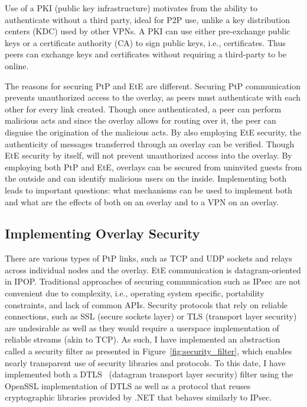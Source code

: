 Use of a PKI (public key infrastructure) motivates from the ability to
authenticate without a third party, ideal for P2P use, unlike a key
distribution centers (KDC) used by other VPNs.  A PKI can use either
pre-exchange public keys or a certificate authority (CA) to sign public keys,
i.e., certificates.  Thus peers can exchange keys and certificates without
requiring a third-party to be online.

The reasons for securing PtP and EtE are different.  Securing PtP communication
prevents unauthorized access to the overlay, as peers must authenticate with
each other for every link created.  Though once authenticated, a peer can
perform malicious acts and since the overlay allows for routing over it, the
peer can disguise the origination of the malicious acts.  By also employing EtE
security, the authenticity of messages transferred through an overlay can be
verified.  Though EtE security by itself, will not prevent unauthorized access
into the overlay.  By employing both PtP and EtE, overlays can be secured from
uninvited guests from the outside and can identify malicious users on the
inside.  Implementing both leads to important questions: what mechanisms can be
used to implement both and what are the effects of both on an overlay and to a
VPN on an overlay.

\subsection{Implementing Overlay Security}

There are various types of PtP links, such as TCP and UDP sockets and relays
across individual nodes and the overlay.  EtE communication is
datagram-oriented in IPOP.  Traditional approaches of securing communication
such as IPsec are not convenient due to complexity, i.e., operating system
specific, portability constraints, and lack of common APIs.  Security protocols
that rely on reliable connections, such as SSL (secure sockets layer) or TLS
(transport layer security) are undesirable as well as they would require a
userspace implementation of reliable streams (akin to TCP).  As such, I have
implemented an abstraction called a security filter as presented in
Figure~\ref{fig:security_filter}, which enables nearly transparent use of
security libraries and protocols.  To this date, I have implemented both a
DTLS~\cite{dtls} (datagram transport layer security) filter using the OpenSSL
implementation of DTLS as well as a protocol that reuses cryptographic
libraries provided by .NET that behaves similarly to IPsec.


